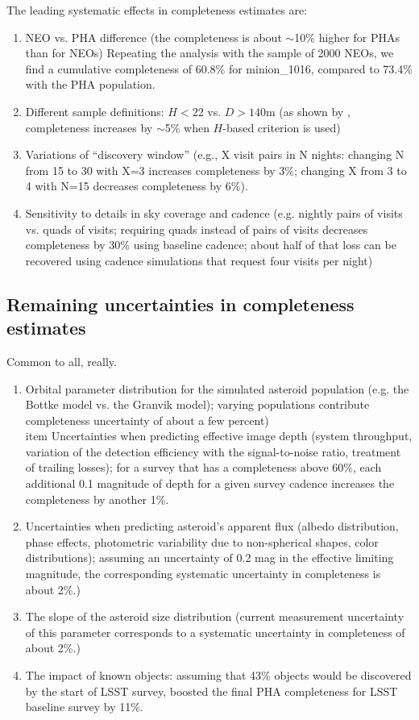 The leading systematic effects in completeness estimates are: 
\begin{enumerate}
\item NEO vs. PHA difference (the completeness is about $\sim$10\% higher for PHAs than for NEOs) 
Repeating the analysis with the sample of 2000 NEOs, we find a cumulative completeness of 60.8\% for minion\_1016, compared to 73.4\% with the PHA population. 

\item Different sample definitions: $H<22$ vs. $D>140$m (as shown by \citep{GMS2016}, completeness increases by $\sim$5\% when $H$-based criterion is used) 
\item Variations of ``discovery window'' (e.g., X visit pairs in N nights: changing N from 15 to 30 with X=3 increases
          completeness by 3\%; changing X from 3 to 4 with N=15 decreases completeness by 6\%). 
\item Sensitivity to details in sky coverage and cadence (e.g. nightly pairs of visits vs. quads of visits;
          requiring quads instead of pairs of visits decreases completeness by 30\% using baseline cadence; 
          about half of that loss can be recovered using cadence simulations that request four visits per night) 
\end{enumerate}          
    
    
\subsection{Remaining uncertainties in completeness estimates}

Common to all, really.          

\begin{enumerate}
\item Orbital parameter distribution for the simulated asteroid population (e.g. the Bottke model
             vs. the Granvik model); varying populations contribute completeness uncertainty of about a few percent) 
\\item Uncertainties when predicting effective image depth (system throughput, variation of the detection efficiency
          with the signal-to-noise ratio, treatment of trailing losses); for a survey that has a completeness above 60\%, 
          each additional 0.1 magnitude of depth for a given survey cadence increases the completeness by another 1\%.
\item Uncertainties when predicting asteroid's apparent flux (albedo distribution, phase effects, photometric variability 
          due to non-spherical shapes, color distributions); assuming an uncertainty of 0.2 mag in the effective 
          limiting magnitude, the corresponding  systematic uncertainty in completeness is about 2\%.)
\item The slope of the asteroid size distribution (current measurement uncertainty of this parameter 
          corresponds to a systematic uncertainty in completeness of about 2\%.)
\item The impact of known objects: assuming that 43\% objects would be discovered by the start of
          LSST survey, \cite{GMS2016} boosted the final PHA completeness for LSST baseline survey by 11\%. 
\end{enumerate} 

